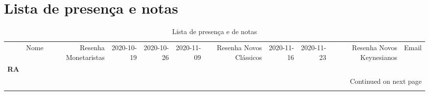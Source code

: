 \documentclass[11pt]{article}
\begin{document}
\section{Lista de presença e notas}
\label{sec:orge14cc5f}
\begin{center}\begin{landscape}
\small
\setlength\LTleft{0pt}
\setlength\LTright{0pt}
\begin{longtable}{llrrrrrrrrl}
\caption{Lista de presença e de notas}\label{lista}\\
\toprule
{} &                                  Nome &  Resenha Monetaristas &  2020-10-19 &  2020-10-26 &  2020-11-09 &  Resenha Novos Clássicos &  2020-11-16 &  2020-11-23 &  Resenha Novos Keynesianos &                   Email \\
\textbf{RA    } &                                       &                       &             &             &             &                          &             &             &                            &                         \\
\midrule
\endhead
\midrule
\multicolumn{11}{r}{{Continued on next page}} \\
\midrule
\endfoot


\end{longtable}
\end{landscape}
\end{center}
\end{document}
